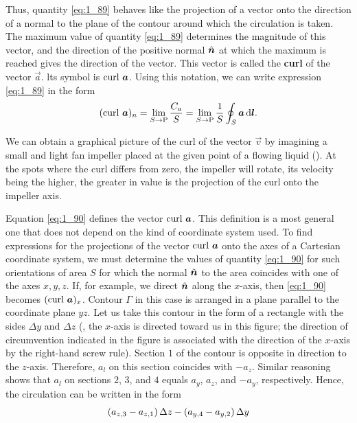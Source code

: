 Thus, quantity \eqref{eq:1_89} behaves like the projection of a vector onto the direction of a normal to the plane of the contour around which the circulation is taken. The maximum value of quantity \eqref{eq:1_89} determines the magnitude of this vector, and the direction of the positive normal $\hat{\boldsymbol{n}}$ at which the maximum is reached gives the direction of the vector. This vector is called the \textbf{curl} of the vector $\vec{a}$. lts symbol is $\text{curl~}\boldsymbol{a}$. Using this notation, we can write expression \eqref{eq:1_89} in the form
\begin{equation}\label{eq:1_90}
	(\text{curl~}\boldsymbol{a})_n = \lim_{S\to\text{P}} \frac{C_a}{S} = \lim_{S\to\text{P}} \frac{1}{S} \oint_S \boldsymbol{a}\, \mathrm{d}\boldsymbol{l}.
\end{equation}

We can obtain a graphical picture of the curl of the vector $\vec{v}$ by imagining a small and light fan impeller placed at the given point of a flowing liquid (). At the spots where the curl differs from zero, the impeller will rotate, its velocity being the higher, the greater in value is the projection of the curl onto the impeller axis.

Equation \eqref{eq:1_90} defines the vector $\text{curl~}\boldsymbol{a}$. This definition is a most general one that does not depend on the kind of coordinate system used. To find expressions for the projections of the vector $\text{curl~}\boldsymbol{a}$ onto the axes of a Cartesian coordinate system, we must determine the values of quantity \eqref{eq:1_90} for such orientations of area $S$ for which the normal $\hat{\boldsymbol{n}}$ to the area coincides with one of the axes $x, y, z$. If, for example, we direct $\hat{\boldsymbol{n}}$ along the $x$-axis, then \eqref{eq:1_90} becomes $(\text{curl~}\boldsymbol{a})_x$.
Contour $\Gamma$ in this case is arranged in a plane parallel to the coordinate plane $yz$. Let us take this contour in the form of a rectangle with the sides $\Delta{y}$ and $\Delta{z}$ (, the $x$-axis is directed toward us in this figure; the direction of circumvention indicated in the figure is associated with the direction of the $x$-axis by the right-hand screw rule). Section $1$ of the contour is opposite in direction to the $z$-axis. Therefore, $a_l$ on this section coincides with $-a_z$. Similar reasoning shows that $a_l$ on sections $2$, $3$, and $4$ equals $a_y$, $a_z$, and $-a_y$, respectively. Hence, the circulation can be written in the form
\begin{equation}\label{eq:1_91}
	\left(a_{z,3} - a_{z,1}\right) \Delta{z} - \left(a_{y,4} - a_{y,2}\right) \Delta{y}
\end{equation}

